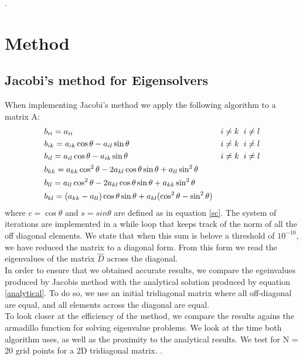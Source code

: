 \documentclass[%
reprint,
amsmath,amssymb,
aps,
]{revtex4-1}
\begin{document}
\newpage.
\newpage 

\section*{Method}
\subsection{Jacobi's method for Eigensolvers}
\noindent When implementing Jacobi's method we apply the following algorithm to a matrix A:
\begin{align*}
	&b_{ii} = a_{ii} \hspace{2mm}& i\not=k &\hspace{2mm} i\not=l\\
	&b_{ik} = a_{ik}\cos\theta -a_{il}\sin\theta \hspace{2mm}& i\not=k &\hspace{2mm} i\not=l \\
	&b_{il}  = a_{il}\cos\theta -a_{ik}\sin\theta \hspace{2mm}& i\not=k &\hspace{2mm} i\not=l\\
	&b_{kk} = a_{kk}\cos^2\theta -2a_{kl}\cos\theta\sin\theta +a_{ll}\sin^2\theta&&\\
	&b_{ll} = a_{ll}\cos^2\theta -2a_{kl}\cos\theta\sin\theta +a_{kk}\sin^2\theta&& \\
	&b_{kl} = (a_{kk}-a_{ll})\cos\theta\sin\theta+a_{kl}(\cos^2\theta -\sin^2\theta)\\
\end{align*}
where $c = \cos\theta$ and $s = sin\theta$ are defined as in equation \ref{sc}. The system of iterations are implemented in a while loop that keeps track of the norm of all the off diagonal elements. We state that when this sum is belove a threshold of $10^{-10}$, we have reduced the matrix to a diagonal form. From this form we read the eigenvalues of the matrix $\hat{D}$ across the diagonal. \\
In order to ensure that we obtained accurate results, we compare the egeinvalues produced by Jacobis method with the analytical solution produced by equation \ref{analytical}. To do so, we use an initial tridiagonal matrix where all off-diagonal are equal, and all elements across the diagonal are equal. \\
To look closer at the efficiency of the method, we compare the results agains the armadillo function for solving eigenvalue problems. We look at the time both algorithm uses, as well as the proximity to the analytical results. We test for N = 20 grid points for a 2D tridiagonal matrix.  
\newpage.
\newpage 
\end{document}
